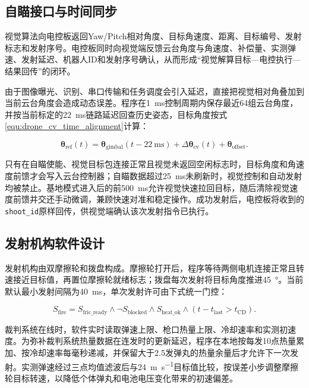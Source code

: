 \subsection{自瞄接口与时间同步}

视觉算法向电控板返回Yaw/Pitch相对角度、目标角速度、距离、目标编号、发射标志和发射序号。电控板同时向视觉端反馈云台角度与角速度、补偿量、实测弹速、发射延迟、机器人ID和发射序号确认，从而形成“视觉解算目标---电控执行---结果回传”的闭环。

由于图像曝光、识别、串口传输和任务调度会引入延迟，直接把视觉相对角叠加到当前云台角度会造成动态误差。程序在\qty{1}{\milli\second}控制周期内保存最近64组云台角度，并按当前标定的\qty{22}{\milli\second}链路延迟回查历史姿态，目标角度按式\eqref{equ:drone_cv_time_alignment}计算：

\begin{equation}
    \boldsymbol{\theta}_{\mathrm{ref}}(t)
    =\boldsymbol{\theta}_{\mathrm{gimbal}}(t-\qty{22}{\milli\second})
    +\Delta\boldsymbol{\theta}_{\mathrm{cv}}(t)
    +\boldsymbol{\theta}_{\mathrm{offset}} .
    \label{equ:drone_cv_time_alignment}
\end{equation}

只有在自瞄使能、视觉目标包连接正常且视觉未返回空闲标志时，目标角度和角速度前馈才会写入云台控制器；自瞄数据超过\qty{25}{\milli\second}未刷新时，视觉控制和自动发射均被禁止。基地模式进入后的前\qty{500}{\milli\second}允许视觉快速拉回目标，随后清除视觉速度前馈并交还手动微调，兼顾快速对准和稳定操作。成功发射后，电控板将收到的\texttt{shoot\_id}原样回传，供视觉端确认该次发射指令已执行。

\subsection{发射机构软件设计}

发射机构由双摩擦轮和拨盘构成。摩擦轮打开后，程序等待两侧电机连接正常且转速接近目标值，再置位摩擦轮就绪标志；拨盘每次发射将目标角度推进\qty{45}{\degree}。当前默认最小发射间隔为\qty{40}{\milli\second}，单次发射许可由下式统一门控：

\begin{equation}
    S_{\mathrm{fire}}=S_{\mathrm{fric\_ready}}
    \land \neg S_{\mathrm{blocked}}
    \land S_{\mathrm{heat\_ok}}
    \land (t-t_{\mathrm{last}}>t_{\mathrm{CD}}).
    \label{equ:drone_shoot_interlock}
\end{equation}

裁判系统在线时，软件实时读取弹速上限、枪口热量上限、冷却速率和实测初速度。为弥补裁判系统热量数据在连发时的更新延迟，程序在本地按每发10点热量累加、按冷却速率每毫秒递减，并保留大于2.5发弹丸的热量余量后才允许下一次发射。实测弹速经过三点均值滤波后与\qty{24}{\meter\per\second}目标值比较，按误差小步调整摩擦轮目标转速，以降低个体弹丸和电池电压变化带来的初速偏差。

